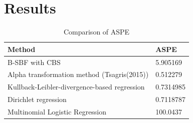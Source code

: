 \section{Results}\label{sec:results}




\begin{table}
\begin{tabular}{ | p{9cm} | m{1.5cm} | } 
\hline
Method & ASPE \\
\hline
B-SBF with CBS & 5.905169 \\ 
\hline
Alpha transformation method (Tsagris(2015)) & 0.512279 \\ 
\hline
Kullback-Leibler-divergence-based regression & 0.7314985 \\
\hline
Dirichlet regression & 0.7118787 \\
\hline
Multinomial Logistic Regression & 100.0437 \\
\hline
\end{tabular}
 \caption{Comparison of ASPE}
 \label{table:1}
\end{table}

